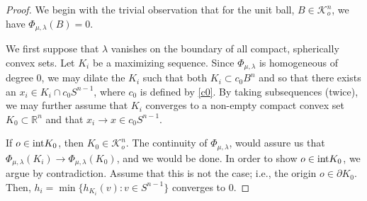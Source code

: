 \documentclass{cpamart1}     %
\theoremstyle{definition}
\theoremstyle{remark}
\newcommand{\kno}{\mathcal K^n_o}
\begin{document}
\begin{proof}
We begin with the trivial observation that for the unit ball, $B\in\kno$, we have $\Phi_{\mu,\lambda}(B) =0$.

We first suppose that $\lambda$ vanishes on the boundary
of all compact, spherically convex sets.
Let $K_i$ be a maximizing sequence. Since $\Phi_{\mu,\lambda}$ is homogeneous
of degree 0,
we may dilate the $K_i$ such that both $K_i\subset c_0B^n$ and so that there exists an  $x_i\in K_i\cap c_0S^{n-1}$,
where $c_0$ is defined by \eqref{c0}.
By taking subsequences (twice), we may further assume that $K_i$ converges to a non-empty
compact convex set $K_0\subset \mathbb{R}^n$ and that $x_i\rightarrow x\in c_0S^{n-1}$.

If $o\in {\rm int} K_0$, then $K_0\in \kno$. The continuity of $\Phi_{\mu,\lambda}$,
would assure us that $\Phi_{\mu,\lambda}(K_i) \to \Phi_{\mu,\lambda}(K_0)$, and we would be done.
In order to show $o\in {\rm int} K_0$, we argue by contradiction.
Assume that this is not the case; i.e., the origin $o\in \partial K_0$. Then,
$h_i=\min\{h_{K_i}(v):v\in S^{n-1}\}$
converges to $0$.


\end{proof}
\end{document}
